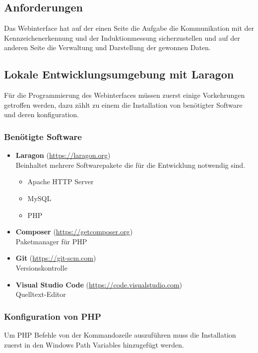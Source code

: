 \subsection{Anforderungen}
Das Webinterface hat auf der einen Seite die Aufgabe die Kommunikation mit der
Kennzeichenerkennung und der Induktionmessung sicherzustellen und auf der
anderen Seite die Verwaltung und Darstellung der gewonnen Daten.

\subsection{Lokale Entwicklungsumgebung mit Laragon}
Für die Programmierung des Webinterfaces müssen zuerst einige Vorkehrungen
getroffen werden, dazu zählt zu einem die Installation von benötigter Software
und deren konfiguration.

\subsubsection{Benötigte Software}

\begin{itemize}
  \item \textbf{Laragon} (\url{https://laragon.org}) \\Beinhaltet mehrere
  Softwarepakete die für die Entwicklung notwendig sind.
  \begin{itemize}
    \item Apache HTTP Server
    \item MySQL
    \item PHP
  \end{itemize}
  \item \textbf{Composer} (\url{https://getcomposer.org}) \\ Paketmanager für
  PHP
  \item \textbf{Git} (\url{https://git-scm.com}) \\ Versionskontrolle
  \item \textbf{Visual Studio Code} (\url{https://code.visualstudio.com}) \\
  Quelltext-Editor
\end{itemize}

\subsubsection{Konfiguration von PHP}
Um PHP Befehle von der Kommandozeile auszuführen muss die Installation zuerst in
den Windows Path Variables hinzugefügt werden.

